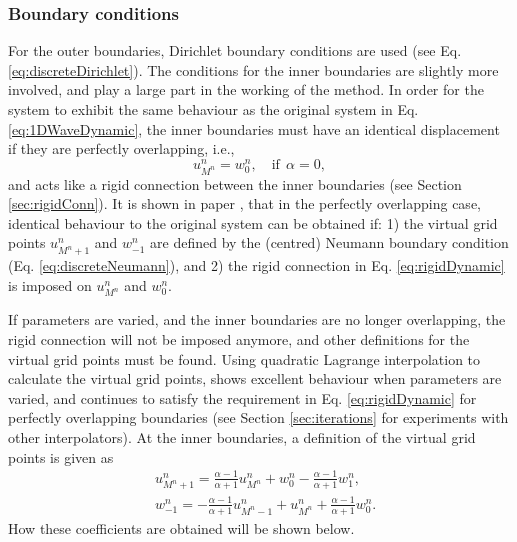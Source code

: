 \subsubsection{Boundary conditions}
For the outer boundaries, Dirichlet boundary conditions are used (see Eq. \eqref{eq:discreteDirichlet}).
The conditions for the inner boundaries are slightly more involved, and play a large part in the working of the method. 
In order for the system to exhibit the same behaviour as the original system in Eq. \eqref{eq:1DWaveDynamic}, the inner boundaries must have an identical displacement if they are perfectly overlapping, i.e.,
\begin{equation}\label{eq:rigidDynamic}
    u_{M^n}^n = w_0^n, \quad \text{if}\ \ \alpha = 0,
\end{equation}
and acts like a rigid connection between the inner boundaries (see Section \ref{sec:rigidConn}). It is shown in paper \citeP[G], that in the perfectly overlapping case, identical behaviour to the original system can be obtained if: 1) the virtual grid points $u_{M^n+1}^n$ and $w_{-1}^n$ are defined by the (centred) Neumann boundary condition (Eq. \eqref{eq:discreteNeumann}), and 2) the rigid connection in Eq. \eqref{eq:rigidDynamic} is imposed on $u_{M^n}^n$ and $w_0^n$. 

If parameters are varied, and the inner boundaries are no longer overlapping, the rigid connection will not be imposed anymore, and other definitions for the virtual grid points must be found. Using quadratic Lagrange interpolation to calculate the virtual grid points, shows excellent behaviour when parameters are varied, and continues to satisfy the requirement in Eq. \eqref{eq:rigidDynamic} for perfectly overlapping boundaries (see Section \ref{sec:iterations} for experiments with other interpolators). At the inner boundaries, a definition of the virtual grid points is given as
\begin{subequations}\label{eq:connectionInterpol}
    \begin{align}
            &u_{M^n+1}^n = \frac{\alpha - 1}{\alpha + 1}u_{M^n}^n + w_0^n - \frac{\alpha - 1}{\alpha + 1}w_1^n,
        \label{eq:calcUMP1}\\
            &w_{-1}^n = -\frac{\alpha - 1}{\alpha + 1}u_{M^n-1}^n + u_{M^n}^n+ \frac{\alpha - 1}{\alpha + 1}w_{0}^n.\label{eq:calcWM1}
    \end{align}
\end{subequations}
How these coefficients are obtained will be shown below. 

